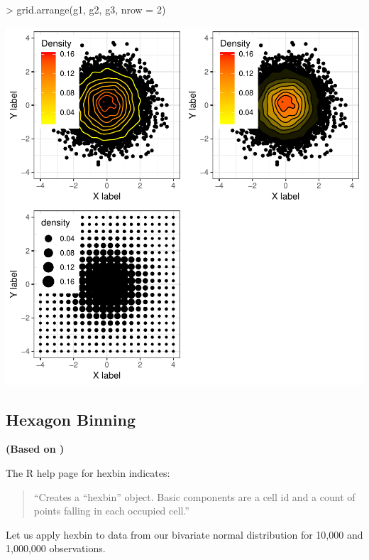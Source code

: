 \documentclass[12pt,letterpaper,final]{article}
\begin{document}
\begin{Schunk}
\begin{Sinput}
> grid.arrange(g1, g2, g3, nrow = 2)
\end{Sinput}
\end{Schunk}
\includegraphics{lect_main-008}


\newpage


\subsection{Hexagon Binning}


{\bf (Based on \cite{CLNL87})}


The R help page for hexbin indicates:
\begin{quotation}
``Creates a ``hexbin'' object. Basic components are a cell id and a count of 
points falling in each occupied cell.''
\end{quotation}

Let us apply hexbin to data from our bivariate normal distribution
for 10,000 and 1,000,000 observations.
\end{document}
